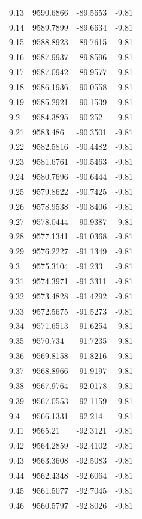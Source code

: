\begin{table}[H]
\begin{tabular}{llll}
9.13 & 9590.6866 & -89.5653 & -9.81 \\
9.14 & 9589.7899 & -89.6634 & -9.81 \\
9.15 & 9588.8923 & -89.7615 & -9.81 \\
9.16 & 9587.9937 & -89.8596 & -9.81 \\
9.17 & 9587.0942 & -89.9577 & -9.81 \\
9.18 & 9586.1936 & -90.0558 & -9.81 \\
9.19 & 9585.2921 & -90.1539 & -9.81 \\
9.2 & 9584.3895 & -90.252 & -9.81 \\
9.21 & 9583.486 & -90.3501 & -9.81 \\
9.22 & 9582.5816 & -90.4482 & -9.81 \\
9.23 & 9581.6761 & -90.5463 & -9.81 \\
9.24 & 9580.7696 & -90.6444 & -9.81 \\
9.25 & 9579.8622 & -90.7425 & -9.81 \\
9.26 & 9578.9538 & -90.8406 & -9.81 \\
9.27 & 9578.0444 & -90.9387 & -9.81 \\
9.28 & 9577.1341 & -91.0368 & -9.81 \\
9.29 & 9576.2227 & -91.1349 & -9.81 \\
9.3 & 9575.3104 & -91.233 & -9.81 \\
9.31 & 9574.3971 & -91.3311 & -9.81 \\
9.32 & 9573.4828 & -91.4292 & -9.81 \\
9.33 & 9572.5675 & -91.5273 & -9.81 \\
9.34 & 9571.6513 & -91.6254 & -9.81 \\
9.35 & 9570.734 & -91.7235 & -9.81 \\
9.36 & 9569.8158 & -91.8216 & -9.81 \\
9.37 & 9568.8966 & -91.9197 & -9.81 \\
9.38 & 9567.9764 & -92.0178 & -9.81 \\
9.39 & 9567.0553 & -92.1159 & -9.81 \\
9.4 & 9566.1331 & -92.214 & -9.81 \\
9.41 & 9565.21 & -92.3121 & -9.81 \\
9.42 & 9564.2859 & -92.4102 & -9.81 \\
9.43 & 9563.3608 & -92.5083 & -9.81 \\
9.44 & 9562.4348 & -92.6064 & -9.81 \\
9.45 & 9561.5077 & -92.7045 & -9.81 \\
9.46 & 9560.5797 & -92.8026 & -9.81 \\

\end{tabular}
\end{table}

